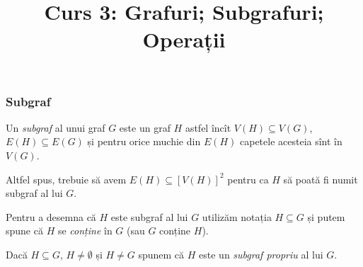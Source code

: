 
\title{Curs 3: Grafuri; Subgrafuri; Operații}



\maketitle

\begin{frame}
  \frametitle{Subgraf}

Un \emph{subgraf} al unui graf $G$ este un graf $H$ astfel încît $V(H)\subseteq V(G)$, $E(H)\subseteq E(G)$ și pentru orice muchie din $E(H)$ capetele 
acesteia sînt în $V(G)$.\pause

Altfel spus, trebuie să avem $E(H)\subseteq [V(H)]^2$ pentru ca $H$ să poată fi numit subgraf al lui $G$.\pause

Pentru a desemna că $H$ este subgraf al lui $G$ utilizăm notația $H\subseteq G$ și putem spune că $H$ se \emph{conține} în $G$ (sau $G$ conține $H$).\pause

Dacă $H\subseteq G$, $H\neq\emptyset$ și $H\neq G$ spunem că $H$ este un \emph{subgraf propriu} al lui $G$.

\end{frame}

